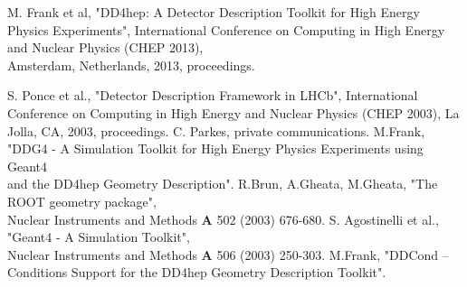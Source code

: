 \documentclass[10pt,a4paper]{article}
\begin{document}
\newpage
\begin{thebibliography}{9}
 M. Frank et al, "DD4hep: A Detector Description Toolkit 
                for High Energy Physics Experiments",
                International Conference on Computing in High Energy and Nuclear Physics  
                (CHEP 2013), \\
                Amsterdam, Netherlands, 2013, proceedings.

 S. Ponce et al., 
                "Detector Description Framework in LHCb", 
                International Conference on Computing in High Energy and Nuclear Physics  (CHEP 2003), 
                La Jolla, CA, 2003, proceedings. 
 C. Parkes, private communications.
 M.Frank, "DDG4 - A Simulation Toolkit for High Energy 
                Physics Experiments using Geant4 \\
                and the DD4hep Geometry Description".
 R.Brun, A.Gheata, M.Gheata, "The ROOT geometry package",\\
                    Nuclear Instruments and Methods {\bf{A}} 502 (2003) 676-680.
  S. Agostinelli et al., 
                   "Geant4 - A Simulation Toolkit", \\
                    Nuclear Instruments and Methods {\bf{A}} 506 (2003) 250-303.
 M.Frank, "DDCond -- Conditions Support for the DD4hep Geometry Description Toolkit".

\end{thebibliography}
\end{document}
